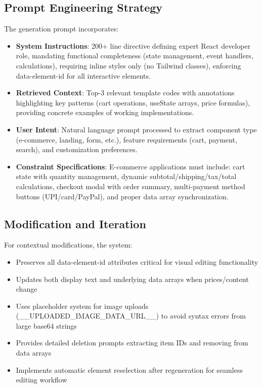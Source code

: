 \documentclass[10pt, conference, letterpaper]{IEEEtran}
\begin{document}
\subsection{Prompt Engineering Strategy}
The generation prompt incorporates:
\begin{itemize}
    \item \textbf{System Instructions}: 200+ line directive defining expert React developer role, mandating functional completeness (state management, event handlers, calculations), requiring inline styles only (no Tailwind classes), enforcing data-element-id for all interactive elements.
    \item \textbf{Retrieved Context}: Top-3 relevant template codes with annotations highlighting key patterns (cart operations, useState arrays, price formulas), providing concrete examples of working implementations.
    \item \textbf{User Intent}: Natural language prompt processed to extract component type (e-commerce, landing, form, etc.), feature requirements (cart, payment, search), and customization preferences.
    \item \textbf{Constraint Specifications}: E-commerce applications must include: cart state with quantity management, dynamic subtotal/shipping/tax/total calculations, checkout modal with order summary, multi-payment method buttons (UPI/card/PayPal), and proper data array synchronization.
\end{itemize}

\subsection{Modification and Iteration}
For contextual modifications, the system:
\begin{itemize}
    \item Preserves all data-element-id attributes critical for visual editing functionality
    \item Updates both display text and underlying data arrays when prices/content change
    \item Uses placeholder system for image uploads (\_\_UPLOADED\_IMAGE\_DATA\_URL\_\_) to avoid syntax errors from large base64 strings
    \item Provides detailed deletion prompts extracting item IDs and removing from data arrays
    \item Implements automatic element reselection after regeneration for seamless editing workflow
\end{itemize}
\end{document}
